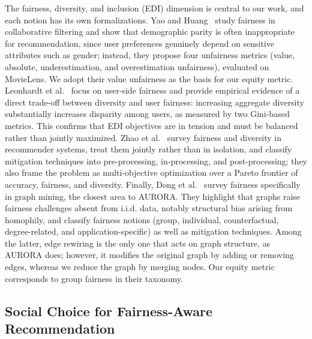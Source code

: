 \documentclass[a4paper,fleqn]{cas-dc}
\begin{document}
The fairness, diversity, and inclusion (EDI) dimension is central to our work,
and each notion has its own formalizations. Yao and
Huang~\citeyearpar{yao_new_2017} study fairness in collaborative filtering and show
that demographic parity is often inappropriate for recommendation, since user
preferences genuinely depend on sensitive attributes such as gender; instead,
they propose four unfairness metrics (value, absolute, underestimation, and
overestimation unfairness), evaluated on MovieLens. We adopt their value
unfairness as the basis for our equity metric. Leonhardt et
al.~\citeyearpar{leonhardt_user_2018} focus on user-side fairness and provide
empirical evidence of a direct trade-off between diversity and user fairness:
increasing aggregate diversity substantially increases disparity among users,
as measured by two Gini-based metrics. This confirms that EDI objectives are
in tension and must be balanced rather than jointly maximized. Zhao et
al.~\citeyearpar{zhao_fairness_2024} survey fairness and diversity in recommender
systems, treat them jointly rather than in isolation, and classify mitigation
techniques into pre-processing, in-processing, and post-processing; they also
frame the problem as multi-objective optimization over a Pareto frontier of
accuracy, fairness, and diversity. Finally, Dong et
al.~\citeyearpar{dong_fairness_2023} survey fairness specifically in graph mining,
the closest area to AURORA. They highlight that graphs raise fairness challenges
absent from i.i.d. data, notably structural bias arising from homophily, and
classify fairness notions (group, individual, counterfactual, degree-related,
and application-specific) as well as mitigation techniques. Among the latter,
edge rewiring is the only one that acts on graph structure, as AURORA does;
however, it modifies the original graph by adding or removing edges, whereas
we reduce the graph by merging nodes. Our equity metric corresponds to group
fairness in their taxonomy.

\subsection{Social Choice for Fairness-Aware Recommendation}
\end{document}
